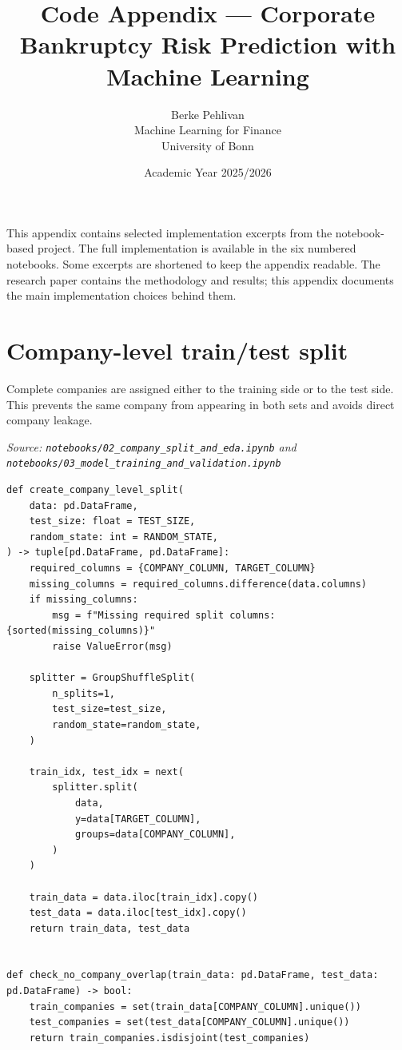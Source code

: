 \documentclass[10pt]{article}
\title{\textbf{Code Appendix --- Corporate Bankruptcy Risk Prediction with Machine Learning}}
\author{Berke Pehlivan\\Machine Learning for Finance\\University of Bonn}
\date{Academic Year 2025/2026}
\begin{document}
\maketitle

This appendix contains selected implementation excerpts from the notebook-based
project. The full implementation is available in the six numbered notebooks.
Some excerpts are shortened to keep the appendix readable. The research paper
contains the methodology and results; this appendix documents the main
implementation choices behind them.

\section{Company-level train/test split}

Complete companies are assigned either to the training side or to the test side.
This prevents the same company from appearing in both sets and avoids direct
company leakage.

\textit{Source: \texttt{notebooks/02\_company\_split\_and\_eda.ipynb} and
\texttt{notebooks/03\_model\_training\_and\_validation.ipynb}}

\begin{lstlisting}
def create_company_level_split(
    data: pd.DataFrame,
    test_size: float = TEST_SIZE,
    random_state: int = RANDOM_STATE,
) -> tuple[pd.DataFrame, pd.DataFrame]:
    required_columns = {COMPANY_COLUMN, TARGET_COLUMN}
    missing_columns = required_columns.difference(data.columns)
    if missing_columns:
        msg = f"Missing required split columns: {sorted(missing_columns)}"
        raise ValueError(msg)

    splitter = GroupShuffleSplit(
        n_splits=1,
        test_size=test_size,
        random_state=random_state,
    )

    train_idx, test_idx = next(
        splitter.split(
            data,
            y=data[TARGET_COLUMN],
            groups=data[COMPANY_COLUMN],
        )
    )

    train_data = data.iloc[train_idx].copy()
    test_data = data.iloc[test_idx].copy()
    return train_data, test_data


def check_no_company_overlap(train_data: pd.DataFrame, test_data: pd.DataFrame) -> bool:
    train_companies = set(train_data[COMPANY_COLUMN].unique())
    test_companies = set(test_data[COMPANY_COLUMN].unique())
    return train_companies.isdisjoint(test_companies)
\end{lstlisting}
\end{document}

